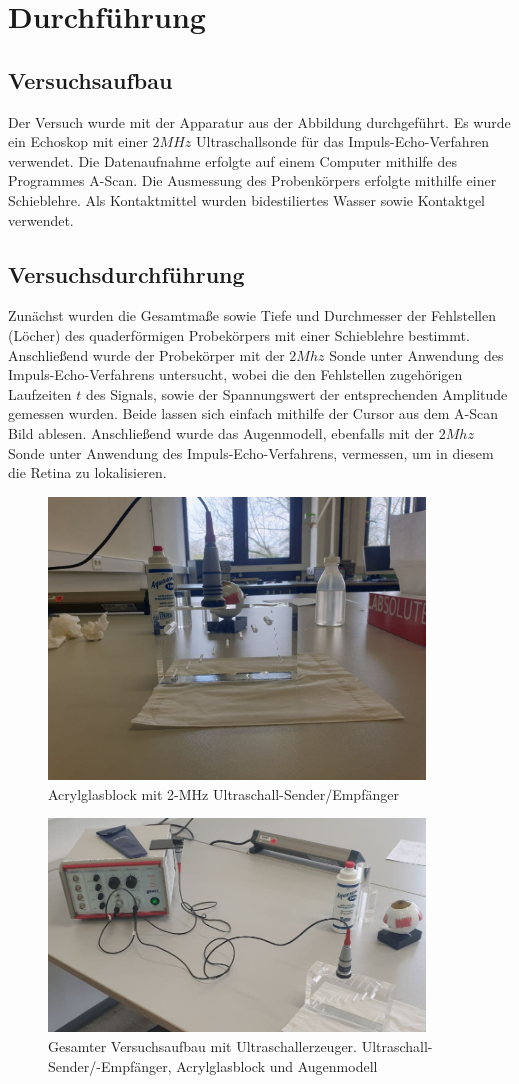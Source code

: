 \section{Durchführung}
\label{sec:durchfuehrung}
\subsection{Versuchsaufbau}
Der Versuch wurde mit der Apparatur aus der Abbildung durchgeführt. Es wurde ein Echoskop mit einer $2MHz$ Ultraschallsonde für das Impuls-Echo-Verfahren verwendet.
Die Datenaufnahme erfolgte auf einem Computer mithilfe des Programmes A-Scan. Die Ausmessung des Probenkörpers erfolgte mithilfe einer Schieblehre. Als Kontaktmittel wurden bidestiliertes Wasser sowie Kontaktgel verwendet.
\subsection{Versuchsdurchführung}
Zunächst wurden die Gesamtmaße sowie Tiefe und Durchmesser der Fehlstellen (Löcher) des quaderförmigen Probekörpers mit einer Schieblehre bestimmt.
Anschließend wurde der Probekörper mit der $2Mhz$ Sonde unter Anwendung des Impuls-Echo-Verfahrens untersucht, wobei die den Fehlstellen zugehörigen Laufzeiten $t$ des Signals, sowie der Spannungswert der entsprechenden Amplitude gemessen wurden. Beide lassen sich einfach mithilfe der Cursor aus dem A-Scan Bild ablesen.
Anschließend wurde das Augenmodell, ebenfalls mit der $2Mhz$ Sonde unter Anwendung des Impuls-Echo-Verfahrens, vermessen, um in diesem die Retina zu lokalisieren.

  \begin{figure}[h]
    \label{fig:block}
    \centering
    \includegraphics[width=10cm]{Block}
    \caption{Acrylglasblock mit 2-MHz Ultraschall-Sender/Empfänger}
\end{figure}


  \begin{figure}[h]
    \label{fig:aufbau}
    \centering
    \includegraphics[width=10cm]{Aufbau}
    \caption{Gesamter Versuchsaufbau mit Ultraschallerzeuger. Ultraschall-Sender/-Empfänger, Acrylglasblock und Augenmodell}
\end{figure}
